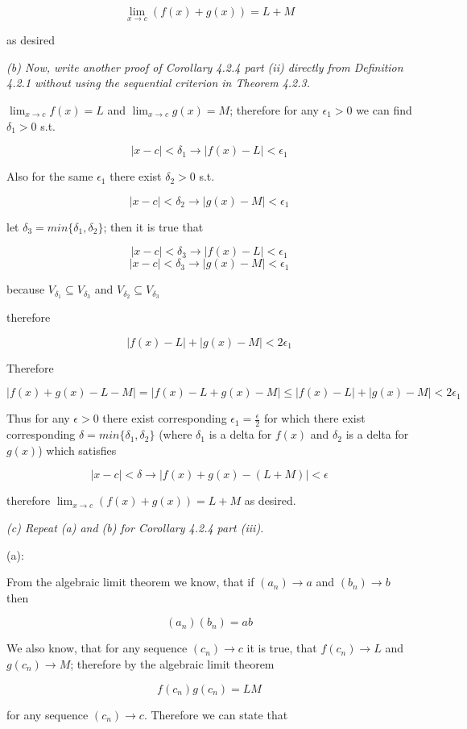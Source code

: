\documentclass[11pt,oneside,titlepage]{article}
\begin{document}
$$\lim_{x \to c}(f(x) + g(x)) = L + M $$

as desired

\textit{(b) Now, write another proof of Corollary 4.2.4 part (ii) directly from Definition 4.2.1 without using the sequential criterion in Theorem 4.2.3.}

$\lim_{x \to c} f(x) = L$ and $\lim_{x \to c} g(x) = M$; therefore for any $\epsilon_1 > 0$ we can find $\delta_1 > 0$ s.t.

$$ |x - c| < \delta_1 \to |f(x) - L| < \epsilon_1 $$

Also for the same $\epsilon_1$ there exist $\delta_2 > 0$ s.t.

$$ |x - c| < \delta_2 \to |g(x) - M| < \epsilon_1 $$

let $\delta_3 = min\{\delta_1, \delta_2\}$; then it is true that 

$$ |x - c| < \delta_3 \to |f(x) - L| < \epsilon_1 $$
$$ |x - c| < \delta_3 \to |g(x) - M| < \epsilon_1 $$

because $V_{\delta_1} \subseteq V_{\delta_3} $ and $V_{\delta_2} \subseteq V_{\delta_3} $

therefore

$$|f(x) - L| + |g(x) - M| < 2 \epsilon_1$$

Therefore 

$$ |f(x) + g(x) - L -  M| = |f(x) - L + g(x) - M| \leq |f(x) - L| + |g(x) - M| < 2 \epsilon_1 $$

Thus for any $\epsilon > 0$ there exist corresponding $\epsilon_1 = \frac{\epsilon}{2}$ for which there
exist corresponding $\delta = min\{\delta_1, \delta_2\}$ (where $\delta_1$ is a delta for $f(x)$ and
$\delta_2$ is a delta for $g(x)$) which satisfies

$$|x - c| < \delta \to |f(x) + g(x) - (L + M)| < \epsilon$$

therefore $\lim_{x \to c}(f(x) + g(x)) = L + M$ as desired.

\textit{(c) Repeat (a) and (b) for Corollary 4.2.4 part (iii).}

(a):

From the algebraic limit theorem we know, that if $(a_n) \to a$ and $(b_n) \to b$ then

$$(a_n) (b_n) = a  b$$

We also know, that for any sequence $(c_n) \to c$ it is true, that $f(c_n) \to L$ and $g(c_n) \to M$;
therefore by the algebraic limit theorem

$$f(c_n)  g(c_n) = L M$$

for any sequence $(c_n) \to c$. Therefore we can state that
\end{document}
